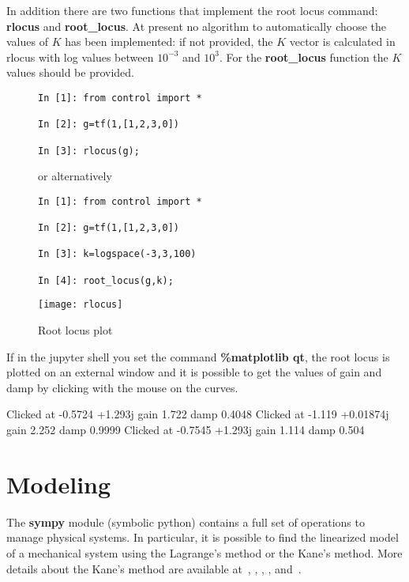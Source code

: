 In addition there are two functions that implement the root locus command: 
\textbf{rlocus} and \textbf{root\_locus}. At present no algorithm to 
automatically choose the values  of $K$ has been implemented: if not provided, 
the $K$ vector is calculated in rlocus with log values between $10^{-3}$ and 
$10^3$. For the \textbf{root\_locus} function the $K$ values should be 
provided. 

\begin{figure}[htbp]
\begin{minipage}[t]{0.55\textwidth}
  \vspace{0pt}
\begin{lstlisting}[linewidth=7cm,xleftmargin=0cm]
In [1]: from control import *

In [2]: g=tf(1,[1,2,3,0])

In [3]: rlocus(g);
\end{lstlisting}

or alternatively

\begin{lstlisting}[linewidth=7cm,xleftmargin=0cm]
In [1]: from control import *

In [2]: g=tf(1,[1,2,3,0])

In [3]: k=logspace(-3,3,100)

In [4]: root_locus(g,k);
\end{lstlisting}

\end{minipage}%
\begin{minipage}[t]{0.5\textwidth}
  \vspace{0pt} \centering
  \texttt{[image: rlocus]}
\end{minipage}
\caption{Root locus plot}
\label{F9}
\end{figure}

If in the jupyter shell you set the command \textbf{\%matplotlib qt}, the root 
locus is plotted on an external window and it is possible to get the values of 
gain and damp by clicking with the mouse on the curves.

\begin{code}
Clicked at    -0.5724    +1.293j gain      1.722 damp     0.4048
Clicked at     -1.119  +0.01874j gain      2.252 damp     0.9999
Clicked at    -0.7545    +1.293j gain      1.114 damp      0.504
\end{code}

\chapter{Modeling}
The \textbf{sympy} module (symbolic python) contains a full set of operations 
to manage physical systems.
In particular,  it is possible to find the linearized model of a 
mechanical system using the Lagrange's method or the Kane's method.
More details about the Kane's method are available at~\cite{KANE1}, 
\cite{KANE2}, \cite{KANE6}, \cite{KANE3}, \cite{KANE4} and~\cite{KANE5}.

